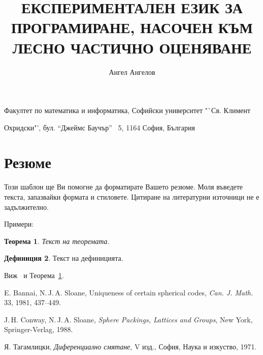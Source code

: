 \documentclass[11pt,a4paper]{amsart}
\title{\MakeUppercase{експериментален език за програмиране, насочен към лесно частично оценяване}}
\author[angel]{Ангел Ангелов}
\newtheorem{theorem}{Теорема}%
\theoremstyle{definition}
\newtheorem{defn}[theorem]{Дефиниция}
\begin{document}
\newcommand\FMI{Факултет по математика и информатика,
Софийски университет "`Св. Климент\par Охридски"',
бул. "`Джеймс Баучър"' \No~5, 1164 София, България}

\newcommand\NSF{Фонд "`Научни изследвания"' при МОН\xspace}

\newcommand\SUF{Фонд "`Научни изследвания"' при СУ "`Св. Климент Охридски"'\xspace}

\renewcommand\emailaddrname{{\itshape E-mail}}

\maketitle
\begin{center}
\FMI
\end{center}

\thispagestyle{empty}

\bigskip

\section*{Резюме%
}

\bigskip




\bigskip
Този шаблон ще Ви помогне да форматирате Вашето резюме.
Моля въведете текста, запазвайки формата и стиловете.
Цитиране на литературни източници не е задължително.

Примери:

\begin{theorem}\label{th:1}
Текст на теоремата.
\end{theorem}

\begin{defn}\label{def:1}
Текст на дефиницията.
\end{defn}

Виж~\cite{BS,Tagi} и Теорема~\ref{th:1}.

\begin{thebibliography}{99}

 E. Bannai, N.\,J.\,A. Sloane,
Uniqueness of certain spherical codes,
\emph{Can. J. Math.} 33, 1981, 437--449.

J.\,H. Conway, N.\,J.\,A. Sloane,
\emph{Sphere Packings, Lattices and Groups}, New York, Springer-Verlag, 1988.

Я. Тагамлицки,
\emph{Диференциално смятане},
V изд.,
София, Наука и изкуство, 1971.

\end{thebibliography}
\end{document}
